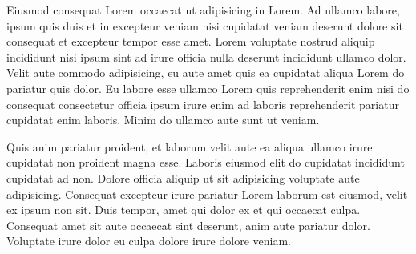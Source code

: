 Eiusmod consequat Lorem occaecat ut adipisicing in Lorem. Ad ullamco labore, ipsum quis duis et in excepteur veniam nisi cupidatat veniam deserunt dolore sit consequat et excepteur tempor esse amet. Lorem voluptate nostrud aliquip incididunt nisi ipsum sint ad irure officia nulla deserunt incididunt ullamco dolor. Velit aute commodo adipisicing, eu aute amet quis ea cupidatat aliqua Lorem do pariatur quis dolor. Eu labore esse ullamco Lorem quis reprehenderit enim nisi do consequat consectetur officia ipsum irure enim ad laboris reprehenderit pariatur cupidatat enim laboris. Minim do ullamco aute sunt ut veniam.

Quis anim pariatur proident, et laborum velit aute ea aliqua ullamco irure cupidatat non proident magna esse. Laboris eiusmod elit do cupidatat incididunt cupidatat ad non. Dolore officia aliquip ut sit adipisicing voluptate aute adipisicing. Consequat excepteur irure pariatur Lorem laborum est eiusmod, velit ex ipsum non sit. Duis tempor, amet qui dolor ex et qui occaecat culpa. Consequat amet sit aute occaecat sint deserunt, anim aute pariatur dolor. Voluptate irure dolor eu culpa dolore irure dolore veniam.


